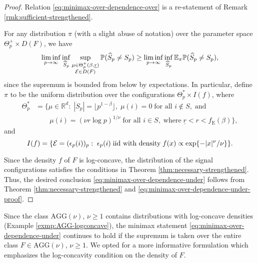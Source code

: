 \begin{proof}%
Relation \eqref{eq:minimax-over-dependence-over} is a re-statement of Remark \ref{rmk:sufficient-strengthened}.

For any distribution $\pi$ (with a slight abuse of notation) over the parameter space $\Theta_p^+\times D(F)$, we have
\begin{equation} \label{eq:minimax-over-dependence-under-proof}
    \liminf_{p\to\infty} \inf_{\widehat{S}_p} \sup_{\substack{\mu\in\Theta_p^+(\beta, \underline{r})\\ {\cal E}\in D(F)}} {\mathbb P}(\widehat{S}_p \neq S_p) 
\ge \liminf_{p\to\infty} \inf_{\widehat{S}_p} {\mathbb E}_{\pi} {\mathbb P}(\widehat{S}_p \neq S_p),
\end{equation}
since the supremum is bounded from below by expectations.
In particular, define $\pi$ to be the uniform distribution over the configurations $\Theta_p^*\times I(f)$, where
\begin{align*}
    \Theta_p^* &=
    \{\mu\in\mathbb{R}^d:\;|S_p|=\lfloor p^{1-\beta}\rfloor,\;\mu(i)=0\;\text{for all }i\not\in S, \;\text{and}\\
    &\quad\quad\mu(i) = (\nu{r}\log{p})^{1/\nu}\;\text{for all }i\in S,\;\text{where}\;\underline{r}<r<f_{\mathrm{E}}(\beta)\},
\end{align*}
and 
\begin{equation*}
    I(f)=\{{\cal E}=(\epsilon_p(i))_p:\;\epsilon_p(i)\;\text{iid with density}\; f(x)\propto \exp\{-|x|^\nu/\nu\}\}.
\end{equation*}

Since the density $f$ of $F$ is log-concave, the distribution of the signal configurations satisfies the conditions in Theorem \ref{thm:necessary-strengthened}.
Thus, the desired conclusion \eqref{eq:minimax-over-dependence-under} follows from Theorem \ref{thm:necessary-strengthened} and \eqref{eq:minimax-over-dependence-under-proof}.
\end{proof}

\begin{remark}
Since the class $\text{AGG}(\nu)$, $\nu\ge1$ contains distributions with log-concave densities (Example \ref{exmp:AGG-logconcave}), the minimax statement \eqref{eq:minimax-over-dependence-under} continues to hold if the supremum is taken over the entire class $F\in\text{AGG}(\nu)$, $\nu\ge1$.
We opted for a more informative formulation which emphasizes the log-concavity condition on the density of $F$.
\end{remark}

